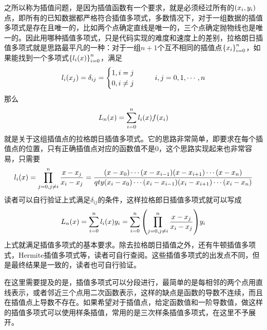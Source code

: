 \documentclass[12pt,a4paper,openany,twoside]{book}
\numberwithin{equation}{section}
\begin{document}
      之所以称为插值问题，是因为插值函数有一个要求，就是必须经过所有的$\qty(x_i,y_i)$点，即所有的已知数据都严格符合插值多项式，多数情况下，对于一组数据的插值多项式是存在且唯一的，比如两个点确定直线是唯一的，三个点确定抛物线也是唯一的。因此用哪种插值多项式，只是代码实现的难度和速度上的差别，拉格朗日插值多项式就是思路最平凡的一种：对于一组$n+1$个互不相同的插值点$\qty{x_i}_{i=0}^n$，如果能找到一个多项式$\qty{l_{i}\qty(x)}_{i=0}^{n}$，满足
      \begin{equation}
        l_{i}\qty(x_{j})=\delta_{i j}=\begin{cases}
          1,i=j \\
          0,i\neq j 
        \end{cases}\ \ \ \ \ i,j=0,1,\cdots,n
      \end{equation}
      那么
      \begin{equation}
        L_{n}\qty(x)=\sum_{i=0}^{n}{l_{i}\qty(x)f\qty(x_{i})}
      \end{equation}
      就是关于这组插值点的拉格朗日插值多项式。它的思路非常简单，即要求在每个插值点的位置，只有正确插值点对应的函数值不是0，这个思路实现起来也非常容易，只需要
      \begin{equation}
        l_{i}(x)=\prod_{j=0,j\neq i}^n{\frac{x-x_j}{x_i-x_j}}=\frac{\qty(x-x_0)\cdots\qty(x-x_{i-1})\qty(x-x_{i+1})\cdots\qty(x-x_{n})}{qty(x_{i}-x_0)\cdots\qty(x_i-x_{i-1})\qty(x_i-x_{i+1})\cdots\qty(x_i-x_{n})}
      \end{equation}
      读者可以自行验证上式满足$\delta_{ij}$的条件，这样拉格郎日插值多项式就可以写成
      \begin{equation}
        L_{n}\qty(x)=\sum_{i=0}^n{l_{i}\qty(x)y_i}=\sum_{i=0}^{n}{\qty(\prod_{j=0,j\neq i}^n \frac{x-x_j}{x_i-x_j})y_i}
      \end{equation}
      上式就满足插值多项式的基本要求。除去拉格朗日插值之外，还有牛顿插值多项式，Hermite插值多项式等，读者可自行查阅。这些插值多项式的出发点不同，但是最终结果是一致的，读者也可自行验证。
      
      在这里需要提及的是，插值多项式可以分段进行，最简单的是每相邻的两个点用直线表示，或者邻近三个点用二次函数表示，这样的缺点是函数的导数不连续，而且在插值点上导数不存在。如果希望对于插值点，给定函数值和一阶导数值，做这样的插值多项式可以使用样条插值，常用的是三次样条插值多项式，在这里不予展开。
\end{document}

